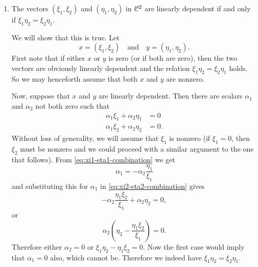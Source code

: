 \begin{enumerate}
\item The vectors $(\xi_1, \xi_2)$ and $(\eta_1, \eta_2)$ in $\mathcal{C}^2$
  are linearly dependent if and only if $\xi_1\eta_2 = \xi_2\eta_1$.
  \begin{solution}
    We will show that this is true. Let
    \begin{equation*}
      x = (\xi_1, \xi_2)
      \quad\text{and}\quad
      y = (\eta_1, \eta_2).
    \end{equation*}
    First note that if either $x$ or $y$ is zero (or if both are
    zero), then the two vectors are obviously linearly dependent and
    the relation $\xi_1\eta_2 = \xi_2\eta_1$ holds. So we may
    henceforth assume that both $x$ and $y$ are nonzero.

    Now, suppose that $x$ and $y$ are linearly dependent. Then there
    are scalars $\alpha_1$ and $\alpha_2$ not both zero such that
    \begin{align}
      \label{eq:xi1-eta1-combination}
      \alpha_1\xi_1 + \alpha_2\eta_1 &= 0 \\
      \label{eq:xi2-eta2-combination}
      \alpha_1\xi_2 + \alpha_2\eta_2 &= 0.
    \end{align}
    Without loss of generality, we will assume that $\xi_1$ is nonzero
    (if $\xi_1 = 0$, then $\xi_2$ must be nonzero and we could proceed
    with a similar argument to the one that follows). From
    \eqref{eq:xi1-eta1-combination} we get
    \begin{equation*}
      \alpha_1 = -\alpha_2\frac{\eta_1}{\xi_1}
    \end{equation*}
    and substituting this for $\alpha_1$ in
    \eqref{eq:xi2-eta2-combination} gives
    \begin{equation*}
      -\alpha_2\frac{\eta_1\xi_2}{\xi_1} + \alpha_2\eta_2 = 0,
    \end{equation*}
    or
    \begin{equation*}
      \alpha_2\left(\eta_2 - \frac{\eta_1\xi_2}{\xi_1}\right) = 0.
    \end{equation*}
    Therefore either $\alpha_2 = 0$ or
    $\xi_1\eta_2 - \eta_1\xi_2 = 0$. Now the first case would imply
    that $\alpha_1 = 0$ also, which cannot be. Therefore we indeed
    have $\xi_1\eta_2 = \xi_2\eta_1$.


\end{solution}
\end{enumerate}

